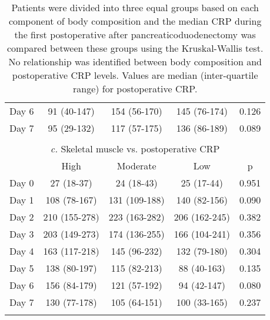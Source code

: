 \begin{table}[p]
\begin{tabular}{|l c c c c |}
		Day 6 & 91 (40-147)   & 154 (56-170)  & 145 (76-174)  & 0.126          \\
		Day 7 & 95 (29-132)   & 117 (57-175)  & 136 (86-189)  & 0.089          \\ \hline
		                         \multicolumn{5}{c}{}                          \\
		\multicolumn{5}{c}{\textit{c.} Skeletal muscle vs. postoperative CRP}  \\ \hline
		      & High          & Moderate      & Low           & p              \\
		Day 0 & 27 (18-37)    & 24 (18-43)    & 25 (17-44)    & 0.951          \\
		Day 1 & 108 (78-167)  & 131 (109-188) & 140 (82-156)  & 0.090          \\
		Day 2 & 210 (155-278) & 223 (163-282) & 206 (162-245) & 0.382          \\
		Day 3 & 203 (149-273) & 174 (136-255) & 166 (104-241) & 0.356          \\
		Day 4 & 163 (117-218) & 145 (96-232)  & 132 (79-180)  & 0.304          \\
		Day 5 & 138 (80-197)  & 115 (82-213)  & 88 (40-163)   & 0.135          \\
		Day 6 & 156 (84-179)  & 121 (57-192)  & 94 (42-147)   & 0.080          \\
		Day 7 & 130 (77-178)  & 105 (64-151)  & 100 (33-165)  & 0.237          \\ \hline
		                         \multicolumn{5}{c}{}
	\end{tabular}
	\caption*{Patients were divided into three equal groups based on each component of body composition and the median CRP during the first postoperative after pancreaticoduodenectomy was compared between these groups using the Kruskal-Wallis test. 
	No relationship was identified between body composition and postoperative CRP levels. 
	Values are median (inter-quartile range) for postoperative CRP. }
\end{table}



